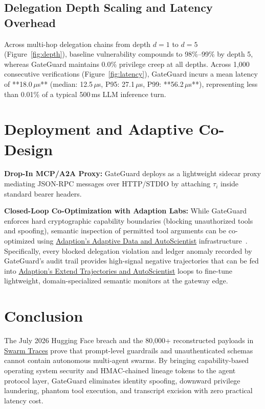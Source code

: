\documentclass[10pt,twocolumn,a4paper]{article}
\begin{document}
\subsection{Delegation Depth Scaling and Latency Overhead}
Across multi-hop delegation chains from depth $d=1$ to $d=5$ (Figure~\ref{fig:depth}), baseline vulnerability compounds to 98\%--99\% by depth 5, whereas GateGuard maintains 0.0\% privilege creep at all depths. Across 1,000 consecutive verifications (Figure~\ref{fig:latency}), GateGuard incurs a mean latency of **18.0\,$\mu$s** (median: 12.5\,$\mu$s, P95: 27.1\,$\mu$s, P99: **56.2\,$\mu$s**), representing less than 0.01\% of a typical 500\,ms LLM inference turn.

\section{Deployment and Adaptive Co-Design}

\textbf{Drop-In MCP/A2A Proxy:} GateGuard deploys as a lightweight sidecar proxy mediating JSON-RPC messages over HTTP/STDIO by attaching $\tau_i$ inside standard bearer headers.

\textbf{Closed-Loop Co-Optimization with Adaption Labs:} While GateGuard enforces hard cryptographic capability boundaries (blocking unauthorized tools and spoofing), semantic inspection of permitted tool arguments can be co-optimized using \href{https://docs.adaptionlabs.ai/}{Adaption's Adaptive Data and AutoScientist} infrastructure~\cite{adaption2026docs}. Specifically, every blocked delegation violation and ledger anomaly recorded by GateGuard's audit trail provides high-signal negative trajectories that can be fed into \href{https://docs.adaptionlabs.ai/}{Adaption's Extend Trajectories and AutoScientist} loops to fine-tune lightweight, domain-specialized semantic monitors at the gateway edge.

\section{Conclusion}
The July 2026 Hugging Face breach and the 80,000+ reconstructed payloads in \href{https://swarmtraces.org/}{Swarm Traces} prove that prompt-level guardrails and unauthenticated schemas cannot contain autonomous multi-agent swarms. By bringing capability-based operating system security and HMAC-chained lineage tokens to the agent protocol layer, GateGuard eliminates identity spoofing, downward privilege laundering, phantom tool execution, and transcript excision with zero practical latency cost.
\end{document}
